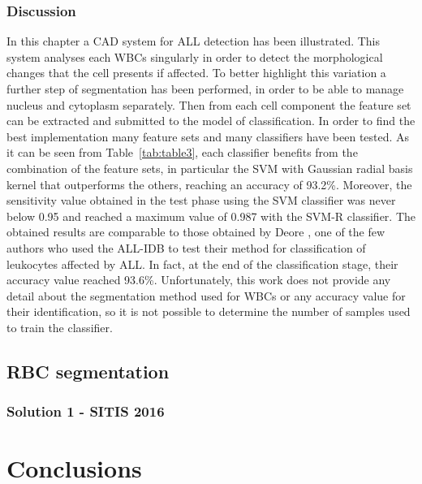 \documentclass[final,a4paper,12pt,english]{UnicaPhdThesis3}
\begin{document}
	\section{Discussion}
	In this chapter a CAD system for ALL detection has been illustrated. This system analyses each WBCs singularly in order to detect the morphological changes that the cell presents if affected. To better highlight this variation a further step of segmentation has been performed, in order to be able to manage nucleus and cytoplasm separately. Then from each cell component the feature set can be extracted and submitted to the model of classification. In order to find the best implementation many feature sets and many classifiers have been tested. As it can be seen from Table~\ref{tab:table3}, each classifier benefits from the combination of the feature sets, in particular the SVM with Gaussian radial basis kernel that outperforms the others, reaching an accuracy of 93.2\%. Moreover, the sensitivity value obtained  in the test  phase using the SVM classifier was never below 0.95 and reached a maximum  value of 0.987 with the SVM-R classifier. The obtained results are comparable to those obtained by Deore \cite{Deore}, one of the few authors who used the ALL-IDB to test their method for classification of leukocytes affected by ALL. In fact, at  the end of the classification stage, their accuracy value reached 93.6\%. Unfortunately, this work does not provide any detail about the segmentation  method used for WBCs or any accuracy  value for their  identification,  so it is not possible to determine  the number of samples used to train the classifier.
	
	\chapter{RBC segmentation}
	\section{Solution 1 - SITIS 2016}
	
	\part{Conclusions} 
\end{document}
